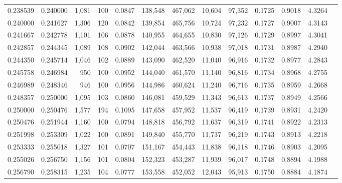 \begin{tabular}{rrrrrrrrrrrrr}
0.238539 & 0.240000 &  1,081 &   100 &                                     0.0847 & 138,548 & 467,062 &  10,604 &  97,352 & 0.1725 & 0.9018 & 4.3264 \\
0.240000 & 0.241627 &  1,306 &   120 &                                     0.0842 & 139,854 & 465,756 &  10,724 &  97,232 & 0.1727 & 0.9007 & 4.3143 \\
0.241667 & 0.242778 &  1,101 &   106 &                                     0.0878 & 140,955 & 464,655 &  10,830 &  97,126 & 0.1729 & 0.8997 & 4.3041 \\
0.242857 & 0.244345 &  1,089 &   108 &                                     0.0902 & 142,044 & 463,566 &  10,938 &  97,018 & 0.1731 & 0.8987 & 4.2940 \\
0.244350 & 0.245714 &  1,046 &   102 &                                     0.0889 & 143,090 & 462,520 &  11,040 &  96,916 & 0.1732 & 0.8977 & 4.2843 \\
0.245758 & 0.246984 &    950 &   100 &                                     0.0952 & 144,040 & 461,570 &  11,140 &  96,816 & 0.1734 & 0.8968 & 4.2755 \\
0.246989 & 0.248346 &    946 &   100 &                                     0.0956 & 144,986 & 460,624 &  11,240 &  96,716 & 0.1735 & 0.8959 & 4.2668 \\
0.248357 & 0.250000 &  1,095 &   103 &                                     0.0860 & 146,081 & 459,529 &  11,343 &  96,613 & 0.1737 & 0.8949 & 4.2566 \\
0.250000 & 0.250476 &  1,577 &   194 &                                     0.1095 & 147,658 & 457,952 &  11,537 &  96,419 & 0.1739 & 0.8931 & 4.2420 \\
0.250476 & 0.251944 &  1,160 &   100 &                                     0.0794 & 148,818 & 456,792 &  11,637 &  96,319 & 0.1741 & 0.8922 & 4.2313 \\
0.251998 & 0.253309 &  1,022 &   100 &                                     0.0891 & 149,840 & 455,770 &  11,737 &  96,219 & 0.1743 & 0.8913 & 4.2218 \\
0.253333 & 0.255018 &  1,327 &   101 &                                     0.0707 & 151,167 & 454,443 &  11,838 &  96,118 & 0.1746 & 0.8903 & 4.2095 \\
0.255026 & 0.256750 &  1,156 &   101 &                                     0.0804 & 152,323 & 453,287 &  11,939 &  96,017 & 0.1748 & 0.8894 & 4.1988 \\
0.256790 & 0.258315 &  1,235 &   104 &                                     0.0777 & 153,558 & 452,052 &  12,043 &  95,913 & 0.1750 & 0.8884 & 4.1874 \\

\end{tabular}
